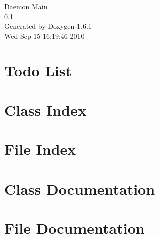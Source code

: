 \documentclass[a4paper]{book}
\begin{document}
\begin{titlepage}
\vspace*{7cm}
\begin{center}
{\Large Daemon Main \\[1ex]\large 0.1 }\\
\vspace*{1cm}
{\large Generated by Doxygen 1.6.1}\\
\vspace*{0.5cm}
{\small Wed Sep 15 16:19:46 2010}\\
\end{center}
\end{titlepage}
\clearemptydoublepage
{}
\tableofcontents
\clearemptydoublepage
{}
\chapter{Todo List}
\label{todo}

\chapter{Class Index}

\chapter{File Index}

\chapter{Class Documentation}












\chapter{File Documentation}





























\printindex
\end{document}
